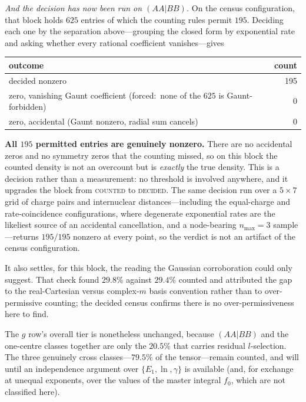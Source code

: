 \documentclass[aps,pra,twocolumn,superscriptaddress,longbibliography]{revtex4-2}
\begin{document}
\emph{And the decision has now been run on $(AA|BB)$.}  On the census
configuration, that block holds $625$ entries of which the counting rules
permit $195$.  Deciding each one by the separation above---grouping the
closed form by exponential rate and asking whether every rational
coefficient vanishes---gives

\begin{center}
\begin{tabular}{lr}
\hline\hline
outcome & count \\
\hline
decided nonzero & 195 \\
zero, vanishing Gaunt coefficient (forced:\ none of the $625$ is Gaunt-forbidden) & 0 \\
zero, accidental (Gaunt nonzero, radial sum cancels) & 0 \\
\hline\hline
\end{tabular}
\end{center}

\textbf{All $195$ permitted entries are genuinely nonzero.}  There are no
accidental zeros and no symmetry zeros that the counting missed, so on
this block the counted density is not an overcount but is \emph{exactly}
the true density.  This is a decision rather than a measurement: no
threshold is involved anywhere, and it upgrades the block from
\textsc{counted} to \textsc{decided}.  The same decision run over a
$5\times 7$ grid of charge pairs and internuclear distances---including the
equal-charge and rate-coincidence configurations, where degenerate
exponential rates are the likeliest source of an accidental cancellation,
and a node-bearing $n_{\max}=3$ sample---returns $195/195$ nonzero at every
point, so the verdict is not an artifact of the census
configuration.

It also settles, for this block, the reading the Gaussian corroboration
could only suggest.  That check found $29.8\%$ against $29.4\%$ counted
and attributed the gap to the real-Cartesian versus complex-$m$ basis
convention rather than to over-permissive counting; the decided census
confirms there is no over-permissiveness here to find.

The $g$ row's overall tier is nonetheless unchanged, because $(AA|BB)$ and
the one-centre classes together are only the $20.5\%$ that carries
residual $l$-selection.  The three genuinely cross classes---$79.5\%$ of the
tensor---remain counted, and will until an independence argument over
$\{E_1, \ln, \gamma\}$ is available (and, for exchange at unequal exponents, over the values
of the master integral $f_0$, which are not classified here).
\end{document}
